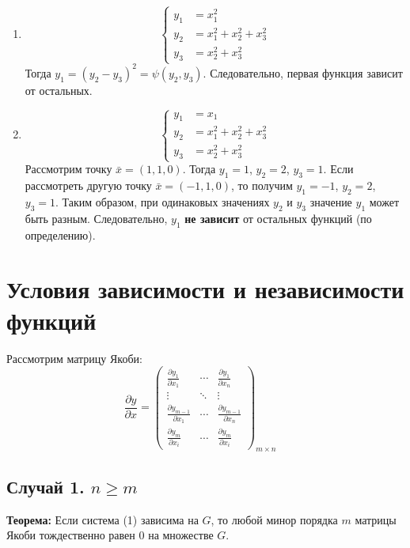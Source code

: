 \documentclass{article}
\begin{document}
\begin{enumerate}
    \item
    \[
    \left\{
    \begin{aligned}
    y_1 &= x_1^2 \\
    y_2 &= x_1^2 + x_2^2 + x_3^2 \\
    y_3 &= x_2^2 + x_3^2
    \end{aligned}
    \right.
    \]
    Тогда $y_1 = (y_2 - y_3)^2 = \psi(y_2, y_3)$. Следовательно, первая функция зависит от остальных.

    \item
    \[
    \left\{
    \begin{aligned}
    y_1 &= x_1 \\
    y_2 &= x_1^2 + x_2^2 + x_3^2 \\
    y_3 &= x_2^2 + x_3^2
    \end{aligned}
    \right.
    \]
    Рассмотрим точку $\bar{x} = (1, 1, 0)$. Тогда $y_1=1$, $y_2=2$, $y_3=1$. Если рассмотреть другую точку $\bar{x} = (-1, 1, 0)$, то получим $y_1=-1$, $y_2=2$, $y_3=1$. Таким образом, при одинаковых значениях $y_2$ и $y_3$ значение $y_1$ может быть разным. Следовательно, $y_1$ \textbf{не зависит} от остальных функций (по определению).
\end{enumerate}

\section*{Условия зависимости и независимости функций}

Рассмотрим матрицу Якоби:
\[
\frac{\partial y}{\partial x} =
\begin{pmatrix}
\frac{\partial y_1}{\partial x_1} & \cdots & \frac{\partial y_1}{\partial x_n} \\
\vdots & \ddots & \vdots \\
\frac{\partial y_{m-1}}{\partial x_1} & \cdots & \frac{\partial y_{m-1}}{\partial x_n} \\
\frac{\partial y_m}{\partial x_i} & \cdots & \frac{\partial y_m}{\partial x_i}
\end{pmatrix}_{m \times n}
\quad
\]

\subsection*{Случай 1. $n \geq m$}

\textbf{Теорема:} Если система (1) зависима на $G$, то любой минор порядка $m$ матрицы Якоби тождественно равен 0 на множестве $G$.
\end{document}
